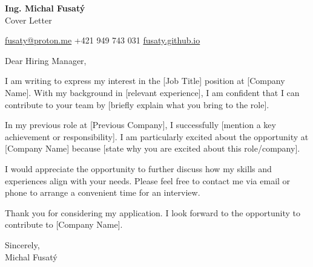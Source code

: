 \documentclass[12pt]{article}
\begin{document}

\begin{center}
	{\Large \bfseries Ing. Michal Fusatý} \\ 
	{\large Cover Letter} 	
\end{center}

\vspace{1.5em}

\begin{center}
    \noindent
    \href{mailto:fusaty@proton.me}{fusaty@proton.me} \hfill \faAngleLeft \hfill
    +421 949 743 031 \hfill \faAngleRight \hfill
    \href{https://fusaty.github.io}{fusaty.github.io} \hfill
\end{center}



\vspace{3em} %

\noindent
Dear Hiring Manager,

I am writing to express my interest in the [Job Title] position at [Company Name]. With my background in [relevant experience], I am confident that I can contribute to your team by [briefly explain what you bring to the role].

In my previous role at [Previous Company], I successfully [mention a key achievement or responsibility]. I am particularly excited about the opportunity at [Company Name] because [state why you are excited about this role/company].

I would appreciate the opportunity to further discuss how my skills and experiences align with your needs. Please feel free to contact me via email or phone to arrange a convenient time for an interview.

Thank you for considering my application. I look forward to the opportunity to contribute to [Company Name].

Sincerely, \\
Michal Fusatý
\end{document}
